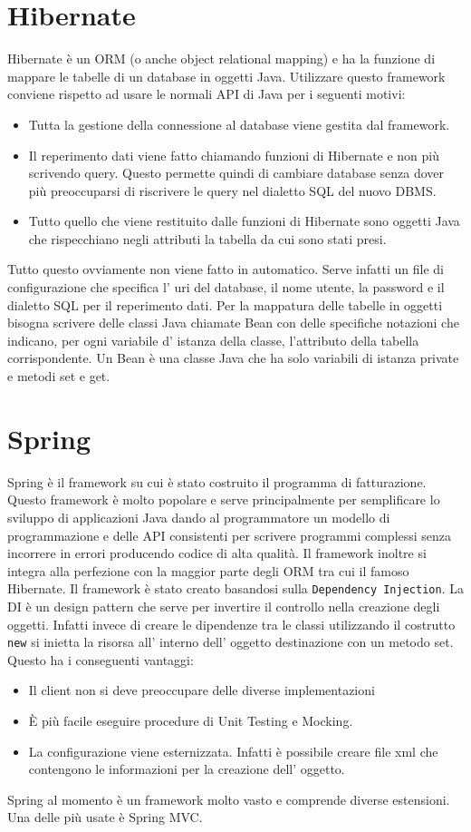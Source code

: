\documentclass[12pt]{book}
\begin{document}
\section{Hibernate}
Hibernate è un ORM (o anche object relational mapping) e ha la funzione di 
mappare le tabelle di un database in oggetti Java.
Utilizzare questo framework conviene rispetto ad usare le normali API di Java
per i seguenti motivi:
\begin{itemize}
    \item Tutta la gestione della connessione al database viene gestita dal 
        framework.
    \item Il reperimento dati viene fatto chiamando funzioni di Hibernate e non
        più scrivendo query. Questo permette quindi di cambiare database senza
        dover più preoccuparsi di riscrivere le query nel dialetto SQL del 
        nuovo DBMS\@.
    \item Tutto quello che viene restituito dalle funzioni di Hibernate sono
        oggetti Java che rispecchiano negli attributi la tabella da cui sono
        stati presi.
\end{itemize}
Tutto questo ovviamente non viene fatto in automatico.
Serve infatti un file di configurazione che specifica l' uri del database,
il nome utente, la password e il dialetto SQL per il reperimento dati.
Per la mappatura delle tabelle in oggetti bisogna scrivere delle
classi Java chiamate Bean con delle specifiche notazioni 
che indicano, per ogni variabile d' istanza della classe, l'attributo della 
tabella corrispondente.
Un Bean è una classe Java che ha solo variabili di istanza private e metodi set 
e get.
\section{Spring}
Spring è il framework su cui è stato costruito il programma di 
fatturazione.
Questo framework è molto popolare e serve principalmente per semplificare lo 
sviluppo di applicazioni Java dando al programmatore un modello di 
programmazione e delle API consistenti per scrivere programmi complessi senza 
incorrere in errori producendo codice di alta qualità.
Il framework inoltre si integra alla perfezione con la maggior parte degli ORM
tra cui il famoso Hibernate.
Il framework è stato creato basandosi sulla \texttt{Dependency Injection}.
La DI è un design pattern che serve per invertire il controllo nella creazione
degli oggetti.
Infatti invece di creare le dipendenze tra le classi utilizzando il costrutto
\texttt{new} si inietta la risorsa all' interno dell' oggetto destinazione
con un metodo set.
Questo ha i conseguenti vantaggi:
\begin{itemize}
    \item Il client non si deve preoccupare delle diverse implementazioni
    \item È più facile eseguire procedure di Unit Testing e Mocking.
    \item La configurazione viene esternizzata. Infatti è possibile creare 
        file xml che contengono le informazioni per la creazione dell' oggetto.
\end{itemize}
Spring al momento è un framework molto vasto e comprende diverse estensioni.
Una delle più usate è Spring MVC\@.
\end{document}
